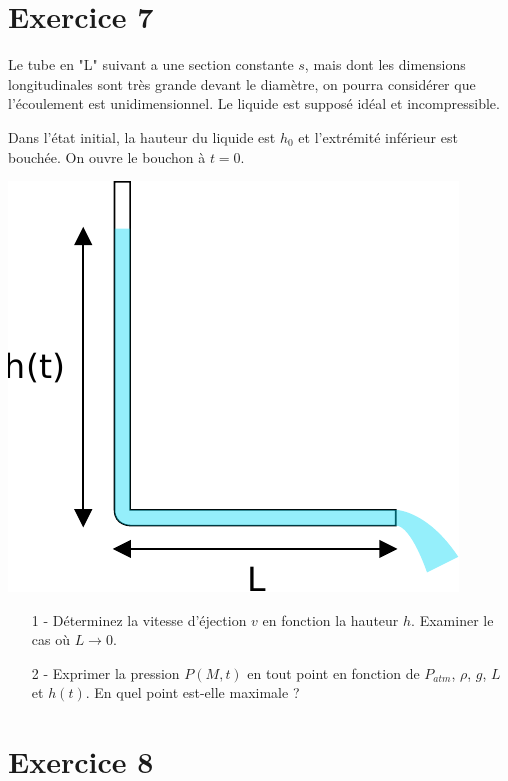 \documentclass{report}
\begin{document}
\newpage

\section*{Exercice 7}

Le tube en "L" suivant a une section constante $s$, mais dont les dimensions longitudinales sont très grande devant le diamètre, on pourra considérer que l'écoulement est unidimensionnel. Le liquide est supposé idéal et incompressible.

Dans l'état initial, la hauteur du liquide est $h_0$ et l'extrémité inférieur est bouchée. On ouvre le bouchon à $t=0$.

\begin{center}
	\includegraphics[scale=0.5]{meca_flu4.pdf}
\end{center}

\begin{itemize}

\item[1 - ] Déterminez la vitesse d'éjection $v$ en fonction la hauteur $h$. Examiner le cas où $L\longrightarrow0$.

\item[2 - ] Exprimer la pression $P(M,t)$ en tout point en fonction de $P_{atm}$, $\rho$, $g$, $L$ et $h(t)$. En quel point est-elle maximale ?

\end{itemize}

\newpage

\section*{Exercice 8}
\end{document}
